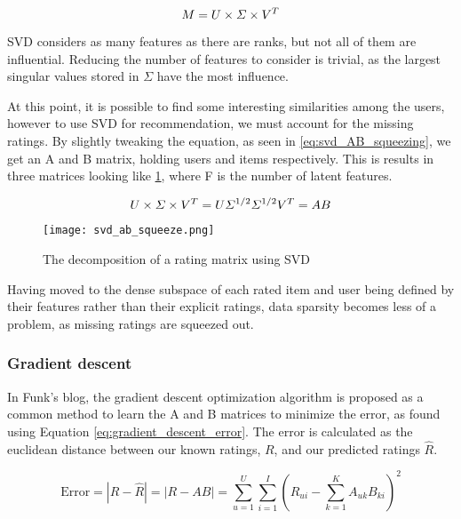 \begin{equation} \label{eq:svd_decomp}
\centering
M = U\times \Sigma \times V^T
\end{equation}

SVD considers as many features as there are ranks, but not all of them are influential. Reducing the number of features to consider is trivial, as the largest singular values stored in $\Sigma$ have the most influence.

At this point, it is possible to find some interesting similarities among the users, however to use SVD for recommendation, we must account for the missing ratings. By slightly tweaking the equation, as seen in \ref{eq:svd_AB_squeezing}, we get an A and B matrix, holding users and items respectively. This is results in three matrices looking like \ref{fig:svdSqueeze}, where F is the number of latent features.

\begin{equation}\label{eq:svd_AB_squeezing}
	\centering
	U\times \Sigma \times V^T = U\Sigma^{1/2} \Sigma^{1/2}V^T = AB
\end{equation}

\begin{figure} [H] \label{fig:svdSqueeze}
	\centering
	\texttt{[image: svd\_ab\_squeeze.png]}
	\caption{The decomposition of a rating matrix using SVD}
\end{figure}
Having moved to the dense subspace of each rated item and user being defined by their features rather than their explicit ratings, data sparsity becomes less of a problem, as missing ratings are squeezed out.

\subsubsection{Gradient descent}
In Funk's blog, the gradient descent optimization algorithm is proposed as a common method to learn the A and B matrices to minimize the error, as found using Equation \ref{eq:gradient_descent_error}. The error is calculated as the euclidean distance between our known ratings, $R$, and our predicted ratings $\hat{R}$.

\begin{equation}\label{eq:gradient_descent_error}
\text{Error} = |R-\hat{R}| = |R - AB| = \sum_{u=1}^{U}\sum_{i=1}^{I}\left (R_{ui}- \sum_{k=1}^{K} A_{uk}B_{ki} \right )^2
\end{equation}

